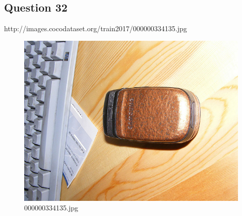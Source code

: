     \subsection*{Question 32}
    http://images.cocodataset.org/train2017/000000334135.jpg
    \begin{figure}[h]
        \centering
        \includegraphics[width=0.8\linewidth]{../image set/easy/000000334135.jpg}
        \caption{000000334135.jpg}
    \end{figure}
